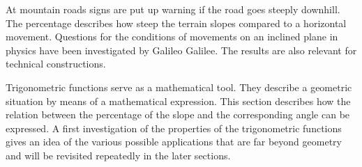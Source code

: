 \begin{MIntro}

At mountain roads signs are put up warning if the road goes steeply downhill.
The percentage describes how steep the terrain slopes compared to a horizontal 
movement. Questions for the conditions of movements on an inclined plane in physics 
have been investigated by Galileo Galilee. The results are also relevant for 
technical constructions.

Trigonometric functions serve as a mathematical tool. They describe a geometric 
situation by means of a mathematical expression.
This section describes how the relation between the percentage of the slope and 
the corresponding angle can be expressed. A first investigation of the properties 
of the trigonometric functions gives an idea of the various possible applications
that are far beyond geometry and will be revisited repeatedly in the later sections. 
\end{MIntro}


